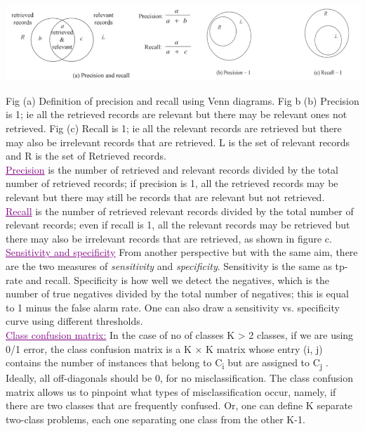 \begin{center}
    \includegraphics[width=.8\textwidth]{Images/A20_img1.png}
\end{center}

Fig (a) Definition of precision and recall using Venn diagrams. Fig b (b) Precision is 1; ie all
the retrieved records are relevant but there may be relevant ones not retrieved. Fig (c) Recall is
1; ie all the relevant records are retrieved but there may also be irrelevant records that are
retrieved. L is the set of relevant records and R is the set of Retrieved records. \\

\textcolor{purple}{\underline{Precision}} is the number of retrieved and relevant records divided by the total number of
retrieved records; if precision is 1, all the retrieved records may be relevant but there may still
be records that are relevant but not retrieved. \\

\textcolor{purple}{\underline{Recall}} is the number of retrieved relevant records divided by the total number of relevant
records; even if recall is 1, all the relevant records may be retrieved but there may also be
irrelevant records that are retrieved, as shown in figure c. \\

\textcolor{purple}{\underline{Sensitivity and specificity}} From another perspective but with the same aim, there are the
two measures of \textit{sensitivity} and \textit{specificity}. Sensitivity is the same as tp-rate and recall.
Specificity is how well we detect the negatives, which is the number of true negatives divided
by the total number of negatives; this is equal to 1 minus the false alarm rate. One can also
draw a sensitivity vs. specificity curve using different thresholds.\\

\textcolor{purple}{\underline{Class confusion matrix:}} In the case of no of classes K > 2 classes, if we are using 0/1 error, the class confusion matrix is a K × K matrix whose entry (i, j) contains the number of instances that belong to C\textsubscript{i} but are assigned to C\textsubscript{j} . Ideally, all off-diagonals should be 0, for no misclassification. The class confusion matrix allows us to pinpoint what types of misclassification occur, namely, if there are two classes that are frequently confused. Or, one can define K separate two-class problems, each one separating one class from the other K-1. \\

